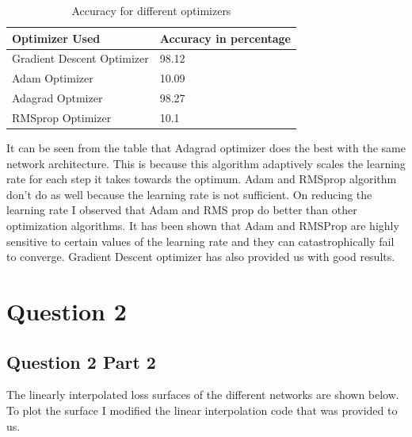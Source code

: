 \documentclass[12pt]{report}
\begin{document}
\begin{table}[H]
	\centering
	\caption{Accuracy for different optimizers}
	\begin{tabular}{|l|l|}
		\hline
		Optimizer Used             & Accuracy in percentage \\ \hline
		Gradient Descent Optimizer & 98.12                  \\ \hline
		Adam Optimizer             & 10.09                  \\ \hline
		Adagrad Optmizer           & 98.27                  \\ \hline
		RMSprop Optimizer          & 10.1                   \\ \hline
	\end{tabular}
	\label{tb:2}
\end{table}

It can be seen from the table that Adagrad optimizer does the best with the same network architecture. This is because this algorithm adaptively scales the learning rate for each step it takes towards the optimum. Adam and RMSprop algorithm don't do as well because the learning rate is not sufficient. On reducing the learning rate I observed that Adam and RMS prop do better than other optimization algorithms. It has been shown that Adam and RMSProp are highly sensitive to certain values of the learning rate and they can catastrophically fail to converge. Gradient Descent optimizer has also provided us with good results.


\chapter*{Question 2}

\section*{Question 2 Part 2}
The linearly interpolated loss surfaces of the different networks are shown below. To plot the surface I modified the linear interpolation code that was provided to us. 
\end{document}
